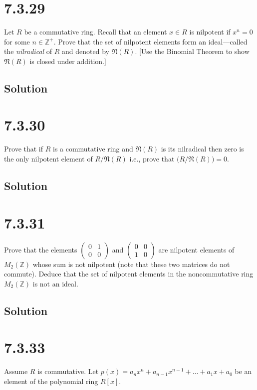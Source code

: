 \documentclass[fleqn]{article}
\begin{document}
    
    \section{7.3.29}
    Let $R$ be a commutative ring.  Recall that an element $x \in R$ is nilpotent if $x^n = 0$ for some $n \in \mathbb{Z}^+$.  Prove that the set of nilpotent elements form an ideal---called the \textit{nilradical} of $R$ and denoted by $\mathfrak{N}(R)$.  [Use the Binomial Theorem to show $\mathfrak{N}(R)$ is closed under addition.]
        
        \subsection{Solution}
        
    
    \section{7.3.30}
    Prove that if $R$ is a commutative ring and $\mathfrak{N}(R)$ is its nilradical then zero is the only nilpotent element of $R/\mathfrak{N}(R)$ i.e., prove that $\mathfrak({R/\mathfrak{N}(R)}) = 0$.
        
        \subsection{Solution}
        
    
    \section{7.3.31}
    Prove that the elements $\begin{pmatrix}
        0 & 1 \\
        0 & 0
    \end{pmatrix}$ and $\begin{pmatrix}
        0 & 0 \\
        1 & 0
    \end{pmatrix}$ are nilpotent elements of $M_2(\mathbb{Z})$ whose sum is not nilpotent (note that these two matrices do not commute).  Deduce that the set of nilpotent elements in the noncommutative ring $M_2(\mathbb{Z})$ is not an ideal.
        
        \subsection{Solution}
        
    
    \section{7.3.33}
    Assume $R$ is commutative.  Let $p(x) = a_n x^n + a_{n - 1} x^{n - 1} + ... + a_1 x + a_0$ be an element of the polynomial ring $R[x]$.
        
\end{document}
